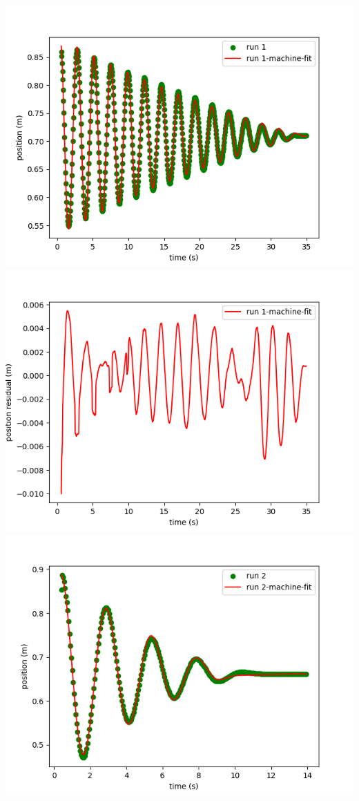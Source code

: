 \documentclass[10pt]{article}
\theoremstyle{definition}
\begin{document}
\inputminted{python}{lab2b-ex.py}
\includegraphics{Figure_0-N.png}\\
\includegraphics{Figure_10-R1RN.png}\\
\includegraphics{Figure_1-N.png}\\
\end{document}

